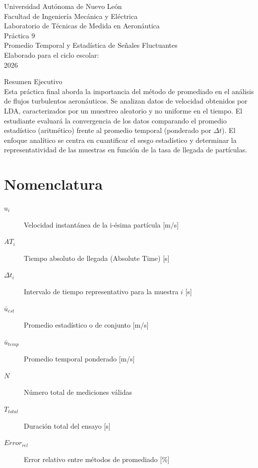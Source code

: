 \documentclass[11pt, a4paper]{article}
\begin{document}
\begin{titlepage}
    \centering
    {\LARGE Universidad Autónoma de Nuevo León}\\[0.5cm]
    {\Large Facultad de Ingeniería Mecánica y Eléctrica}\\[2cm]
    
    {\Large Laboratorio de Técnicas de Medida en Aeronáutica}\\[1cm]
    
    {\Huge Práctica 9}\\[0.5cm]
    {\Large Promedio Temporal y Estadística de Señales Fluctuantes}\\[2cm]
    
    Elaborado para el ciclo escolar:\\
    2026\\[2cm]
    
    \vfill
    
    Resumen Ejecutivo\\
    Esta práctica final aborda la importancia del método de promediado en el análisis de flujos turbulentos aeronáuticos. Se analizan datos de velocidad obtenidos por LDA, caracterizados por un muestreo aleatorio y no uniforme en el tiempo. El estudiante evaluará la convergencia de los datos comparando el promedio estadístico (aritmético) frente al promedio temporal (ponderado por $\Delta t$). El enfoque analítico se centra en cuantificar el sesgo estadístico y determinar la representatividad de las muestras en función de la tasa de llegada de partículas.
\end{titlepage}

\tableofcontents
\newpage

\section*{Nomenclatura}
\begin{description}
    \item[$u_i$] Velocidad instantánea de la i-ésima partícula [m/s]
    \item[$AT_i$] Tiempo absoluto de llegada (Absolute Time) [s]
    \item[$\Delta t_i$] Intervalo de tiempo representativo para la muestra $i$ [s]
    \item[$\bar{u}_{est}$] Promedio estadístico o de conjunto [m/s]
    \item[$\bar{u}_{temp}$] Promedio temporal ponderado [m/s]
    \item[$N$] Número total de mediciones válidas
    \item[$T_{total}$] Duración total del ensayo [s]
    \item[$Error_{rel}$] Error relativo entre métodos de promediado [\%]
\end{description}
\end{document}
